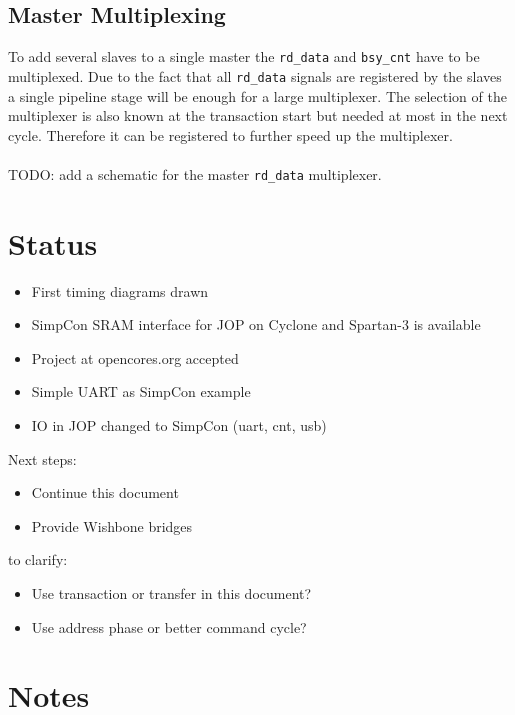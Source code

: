 \documentclass[a4paper,12pt]{scrartcl}
\newcommand{\sign}[1]{{\texttt{#1}}}
\begin{document}
\subsection{Master Multiplexing}

To add several slaves to a single master the \sign{rd\_data} and
\sign{bsy\_cnt} have to be multiplexed. Due to the fact that all
\sign{rd\_data} signals are registered by the slaves a single
pipeline stage will be enough for a large multiplexer. The selection
of the multiplexer is also known at the transaction start but needed
at most in the next cycle. Therefore it can be registered to further
speed up the multiplexer.
\\
\\
TODO: add a schematic for the master \sign{rd\_data} multiplexer.

\section{Status}

\begin{itemize}
    \item First timing diagrams drawn
    \item SimpCon SRAM interface for JOP on Cyclone and Spartan-3 is
    available
    \item Project at opencores.org accepted
    \item Simple UART as SimpCon example
    \item IO in JOP changed to SimpCon (uart, cnt, usb)
\end{itemize}
%
Next steps:
%
\begin{itemize}
    \item Continue this document
    \item Provide Wishbone bridges
\end{itemize}
%
to clarify:
\begin{itemize}
    \item Use transaction or transfer in this document?
    \item Use address phase or better command cycle?
\end{itemize}



\section{Notes}
\end{document}
